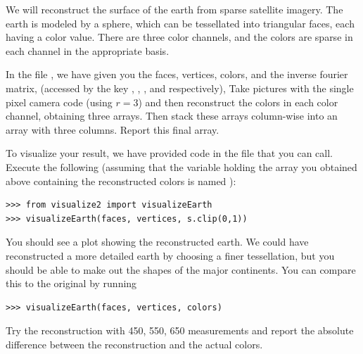 \begin{problem}
We will reconstruct the surface of the earth from sparse satellite imagery. The earth is modeled by a sphere,
which can be tessellated into triangular faces, each having a color value. There are three color 
channels, and the colors are sparse in each channel in the appropriate basis. 

In the file , we have given you the faces, vertices, colors, and the inverse fourier matrix, (accessed by the key , , , and  respectively), Take pictures with the single pixel camera code (using $r=3$) and then reconstruct the colors in each color channel, obtaining
three arrays. Then stack these arrays column-wise into an array with three columns. Report this final array.

To visualize your result, we have provided code in the file  that you can call.
Execute the following (assuming that the variable holding the array
you obtained above containing the reconstructed colors is named ):
\begin{lstlisting}
>>> from visualize2 import visualizeEarth
>>> visualizeEarth(faces, vertices, s.clip(0,1))
\end{lstlisting}
You should see a plot showing the reconstructed earth. We could have reconstructed a more detailed earth by choosing a finer tessellation, but you should be able to make out the shapes of the major continents. You can compare this to the original by running
\begin{lstlisting}
>>> visualizeEarth(faces, vertices, colors)
\end{lstlisting}

Try the reconstruction with 450, 550, 650 measurements and report the absolute difference between the reconstruction and the actual colors.
\end{problem}